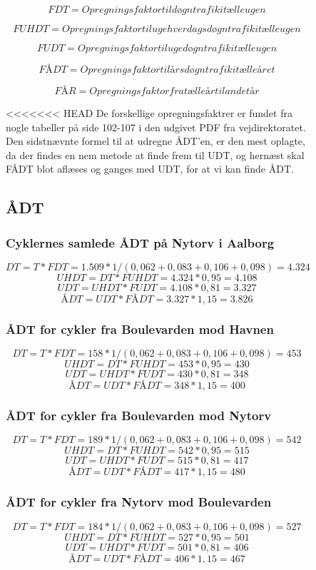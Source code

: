 \begin{figure}[htbp]
$$FDT = Opregningsfaktor til døgntrafik i tælleugen$$

$$FUHDT = Opregningsfaktor til ugehverdagsdøgntrafik i tælleugen$$

$$FUDT = Opregningsfaktor til ugedøgntrafik i tælleugen$$

$$FÅDT = Opregningsfaktor til årsdøgntrafik i tælleåret$$

$$FÅR = Opregningsfaktor fra tælleår til andet år$$

<<<<<<< HEAD
De forskellige opregningsfaktrer er fundet fra nogle tabeller på side 102-107 i den udgivet PDF fra vejdirektoratet. Den sidstnævnte formel til at udregne ÅDT’en, er den mest oplagte, da der findes en nem metode at finde frem til UDT, og hernæst skal FÅDT blot aflæses og ganges med UDT, for at vi kan finde ÅDT.

\subsection{ÅDT}
\label{AEDT}
\subsubsection{Cyklernes samlede ÅDT på Nytorv i Aalborg}
$$DT = T * FDT = 1.509 * 1/(0,062 +0,083+0,106+0,098) = 4.324$$
$$UHDT = DT * FUHDT = 4.324* 0,95 = 4.108$$
$$UDT = UHDT * FUDT = 4.108* 0,81 = 3.327$$
$$ÅDT = UDT * FÅDT = 3.327 * 1,15 = 3.826$$
\subsubsection{ÅDT for cykler fra Boulevarden mod Havnen}
$$DT = T * FDT = 158 * 1/(0,062 +0,083+0,106+0,098) = 453$$
$$UHDT = DT * FUHDT = 453 * 0,95 = 430$$
$$UDT = UHDT * FUDT = 430 * 0,81 = 348$$
$$ÅDT = UDT * FÅDT = 348 * 1,15 = 400$$
\subsubsection{ÅDT for cykler fra Boulevarden mod Nytorv}
$$DT = T * FDT = 189 * 1/(0,062 +0,083+0,106+0,098) = 542$$
$$UHDT = DT * FUHDT = 542 * 0,95 = 515$$
$$UDT = UHDT * FUDT = 515 * 0,81 = 417$$
$$ÅDT = UDT * FÅDT = 417 * 1,15 = 480$$
\subsubsection{ÅDT for cykler fra Nytorv mod Boulevarden}
$$DT = T * FDT = 184* 1/(0,062 +0,083+0,106+0,098) = 527$$
$$UHDT = DT * FUHDT = 527 * 0,95 = 501$$
$$UDT = UHDT * FUDT = 501 * 0,81 = 406$$
$$ÅDT = UDT * FÅDT = 406 * 1,15 = 467$$

\end{figure}
